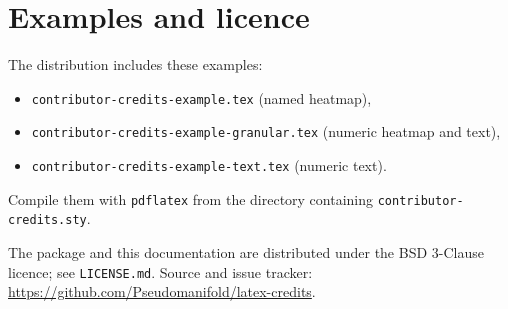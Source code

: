 \documentclass[a4paper,11pt]{article}
\begin{document}
\section{Examples and licence}

The distribution includes these examples:
\begin{itemize}
\item \texttt{contributor-credits-example.tex} (named heatmap),
\item \texttt{contributor-credits-example-granular.tex} (numeric heatmap and text),
\item \texttt{contributor-credits-example-text.tex} (numeric text).
\end{itemize}
Compile them with \texttt{pdflatex} from the directory containing
\texttt{contributor-credits.sty}.

The package and this documentation are distributed under the BSD
3-Clause licence; see \texttt{LICENSE.md}. Source and issue tracker:
\url{https://github.com/Pseudomanifold/latex-credits}.
\end{document}
